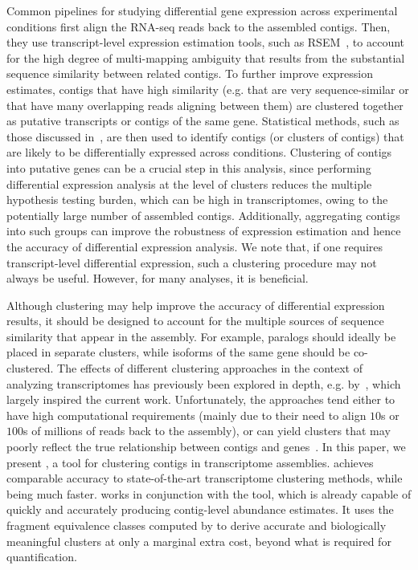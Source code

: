 Common pipelines for studying differential gene expression across experimental conditions first align the RNA-seq reads back to the assembled contigs.  Then, they use transcript-level expression estimation tools, such as RSEM~\citep{rsem}, to account for the high degree of multi-mapping ambiguity that results from the substantial sequence similarity between related contigs. To further improve expression estimates, contigs that have high similarity (e.g. that are very sequence-similar or that have many overlapping reads aligning between them) are clustered together as putative transcripts or contigs of the same gene. Statistical methods, such as those discussed in~\cite{kvam, soneson2013comparison}, are then used to identify contigs (or clusters of contigs) that are likely to be differentially expressed across conditions. Clustering of contigs into putative genes can be a crucial step in this analysis, since performing differential expression analysis at the level of clusters reduces the multiple hypothesis testing burden, which can be high in \denovo transcriptomes, owing to the potentially large number of assembled contigs.  Additionally, aggregating contigs into such groups can improve the robustness of expression estimation and hence the accuracy of differential expression analysis.  We note that, if one requires transcript-level differential expression, such a clustering procedure may not always be useful.  However, for many analyses, it is beneficial. 

Although clustering may help improve the accuracy of differential expression results, it should be designed to account for the multiple sources of sequence similarity that appear in the assembly.  For example, paralogs should ideally be placed in separate clusters, while isoforms of the same gene should be co-clustered.  The effects of different clustering approaches in the context of analyzing \denovo transcriptomes has previously been explored in depth, e.g. by~\citet{corset}, which largely inspired the current work. Unfortunately, the approaches tend either to have high computational requirements (mainly due to their need to align $10$s or $100$s of millions of reads back to the assembly), or can yield clusters that may poorly reflect the true relationship between contigs and genes~\citep{cdhit}.  In this paper, we present \rapclust, a tool for clustering contigs in \denovo transcriptome assemblies.  \rapclust achieves comparable accuracy to state-of-the-art transcriptome clustering methods, while being much faster. \rapclust works in conjunction with the \sailfish tool, which is already capable of quickly and accurately producing contig-level abundance estimates.  It uses the fragment equivalence classes computed by \sailfish to derive accurate and biologically meaningful clusters at only a marginal extra cost, beyond what is required for quantification.


